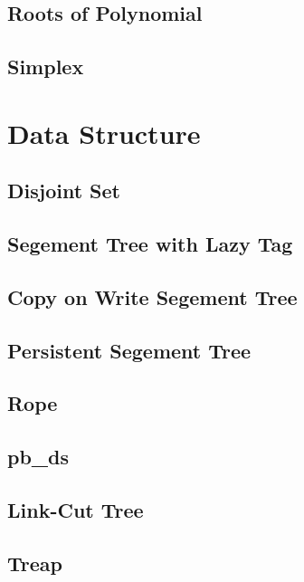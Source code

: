\documentclass[a4paper,10pt,twocolumn,oneside]{article}
\begin{document}
\subsection{Roots of Polynomial}

\subsection{Simplex}


\section{Data Structure}
\subsection{Disjoint Set}

\subsection{Segement Tree with Lazy Tag}

\subsection{Copy on Write Segement Tree}

\subsection{Persistent Segement Tree}

\subsection{Rope}

\subsection{pb\_ds}


\subsection{Link-Cut Tree}

\subsection{Treap}

\end{document}
